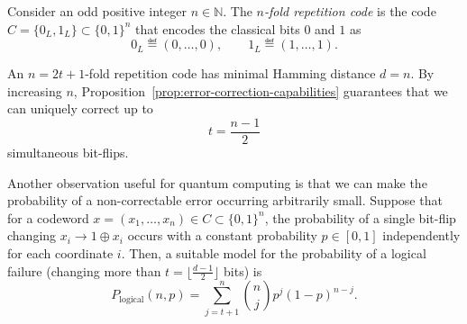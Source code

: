 \documentclass[a4paper, oneside, 12pt]{amsart}
\begin{document}
\begin{definition}\label{def:repetition-code-length-n}
  Consider an odd positive integer \(n \in \mathbb{N}\).
  The \emph{\(n\)-fold repetition code} is the code \(C = \{0_L, 1_L\} \subset \{0,1\}^n\) that encodes the classical bits \(0\) and \(1\) as
  \begin{equation*}
    0_{L} \eqdef (0, \dots , 0), \qquad
    1_{L} \eqdef  (1, \dots , 1).
  \end{equation*}
\end{definition}

An \(n = 2t+1\)-fold repetition code has minimal Hamming distance \(d = n\).
By increasing \(n\), Proposition~\ref{prop:error-correction-capabilities} guarantees that we can uniquely correct up to
\begin{equation*}
  t = \frac{n-1}{2}
\end{equation*}
simultaneous bit-flips.

Another observation useful for quantum computing is that we can make the probability of a non-correctable error occurring arbitrarily small.
Suppose that for a codeword \(x = (x_{1}, \dots , x_{n}) \in C \subset \{0,1\}^{n}\), the probability of a single bit-flip changing \(x_{i} \to 1 \oplus x_{i}\) occurs with a constant probability \(p \in [0, 1]\) independently for each coordinate \(i\).
Then, a suitable model for the probability of a logical failure (changing more than \(t = \lfloor\frac{d-1}{2}\rfloor\) bits) is
\begin{equation}\label{eq:binomial-failure}
  P_{\text{logical}}(n, p) = \sum_{j=t+1}^{n} \binom{n}{j} p^j (1-p)^{n-j}.
\end{equation}
\end{document}
